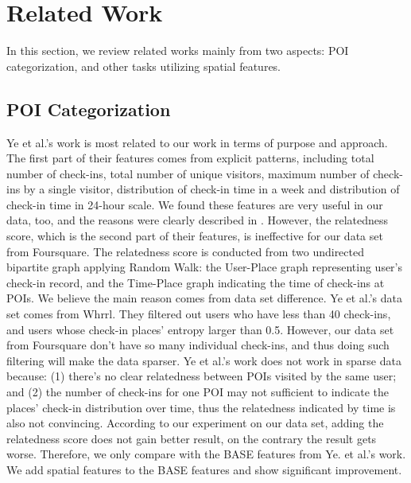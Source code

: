 \section{Related Work}
\label{RelatedWork}
In this section, we review related works mainly from two aspects: 
POI categorization, and other tasks utilizing spatial features.

\subsection{POI Categorization}
Ye et al.'s work is most related to our work in terms of purpose and approach. 
The first part of their features comes from explicit patterns, 
including total number of check-ins, total number of unique visitors, 
maximum number of check-ins by a single visitor, distribution of check-in 
time in a week and distribution of check-in time in 24-hour scale. 
We found these features are very useful in our data, too, 
and the reasons were clearly described in \cite{yemao}. 
However, the relatedness score, which is the second part of their features, 
is ineffective for our data set from Foursquare. The relatedness score is 
conducted from two undirected bipartite graph applying Random Walk: 
the User-Place graph representing user's check-in record, 
and the Time-Place graph indicating the time of check-ins 
at POIs. We believe the main reason comes from data set 
difference. Ye et al.'s data set comes from Whrrl. They 
filtered out users who have less than 40 check-ins, and users whose 
check-in places' entropy larger than 0.5. However, our data set 
from Foursquare don't have so many individual check-ins, and thus
doing such filtering will make the data sparser. Ye et al.'s work 
does not work in sparse data because: (1) there's no clear relatedness between 
POIs visited by the same user; and (2) the number of check-ins for one 
POI may not sufficient to indicate the places' check-in distribution over time, 
thus the relatedness indicated by time is also not convincing. 
According to our experiment on our data set, adding the relatedness 
score does not gain better result, on the contrary the result gets 
worse. Therefore, we only compare with the BASE features from 
Ye. et al.'s work. We add spatial features 
to the BASE features and show significant improvement.

